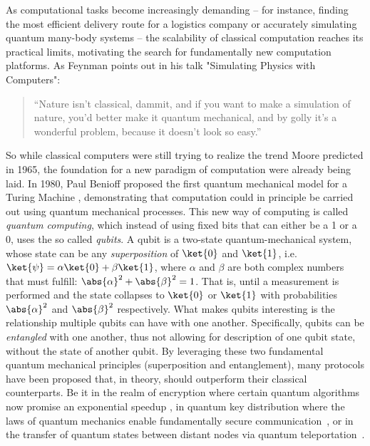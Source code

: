 As computational tasks become increasingly demanding -- for instance, finding the most efficient delivery route for a logistics company \cite{TravellingSalesmanProblem} or accurately simulating quantum many-body systems \cite{FeynmanSimulatingPhysicsWithQuantumComputers,QCMedicine,BlochSimulation} -- the scalability of classical computation reaches its practical limits, motivating the search for fundamentally new computation platforms. As Feynman points out in his talk "Simulating Physics with Computers":
\begin{quote}
	``Nature isn't classical, dammit, and if you want to make a
	simulation of nature, you'd better make it quantum mechanical,
	and by golly it's a wonderful problem, because it doesn't look
	so easy.''\cite{FeynmanSimulatingPhysicsWithQuantumComputers}
\end{quote}

So while classical computers were still trying to realize the trend Moore predicted in 1965, the foundation for a new paradigm of computation were already being laid. In 1980, Paul Benioff proposed the first quantum mechanical model for a Turing Machine \cite{Benioff1980}, demonstrating that computation could in principle be carried out using quantum mechanical processes. This new way of computing is called \textit{quantum computing}, which instead of using fixed bits that can either be a 1 or a 0, uses the so called \textit{qubits}. A qubit is a two-state quantum-mechanical system, whose state can be any \textit{superposition} of $\ket{0}$ and $\ket{1}$, i.e. $\ket{\psi}=\alpha\ket{0} + \beta\ket{1}$, where $\alpha$ and $\beta$ are both complex numbers that must fulfill: $\abs{\alpha}^2 + \abs{\beta}^2=1$. That is, until a measurement is performed and the state collapses to $\ket{0}$ or $\ket{1}$ with probabilities $\abs{\alpha}^2$ and $\abs{\beta}^2$ respectively. What makes qubits interesting is the relationship multiple qubits can have with one another. Specifically, qubits can be \textit{entangled} with one another, thus not allowing for description of one qubit state, without the state of another qubit. By leveraging these two fundamental quantum mechanical principles (superposition and entanglement), many protocols have been proposed that, in theory, should outperform their classical counterparts. Be it in the realm of encryption where certain quantum algorithms now promise an exponential speedup \cite{ShorrsAlgorithm}, in quantum key distribution where the laws of quantum mechanics enable fundamentally secure communication~\cite{BB84Protocol}, or in the transfer of quantum states between distant nodes via quantum teleportation~\cite{QuantumTeleportation}.\\

